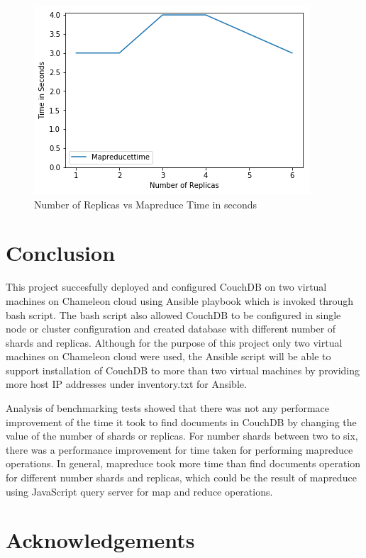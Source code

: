 \begin{figure}[!ht]
  \centering\includegraphics[width=\columnwidth]{../images/ReplicasMapReduce.png}
  \caption{Number of Replicas vs Mapreduce Time in seconds }\label{f:replica-mapreduce}
\end{figure}

\section{Conclusion}
This project succesfully deployed and configured CouchDB  on two virtual machines
on Chameleon cloud using Ansible playbook which is invoked through
bash script. The bash script also allowed CouchDB to be configured in
single node or cluster configuration and created database with
different number of shards and replicas. Although for the purpose of
this project only two virtual machines on Chameleon cloud were used,
the Ansible script will be able to support installation of CouchDB to more
than two virtual machines by providing more host IP addresses under
inventory.txt for Ansible.

Analysis of benchmarking tests showed that there was not any performace
improvement of the time it took to find documents in CouchDB  by
changing the value of the number of shards or replicas. For number
shards between two to six, there was a performance improvement for
time taken for performing mapreduce operations. In general, mapreduce
took more time than find documents operation for different number
shards and replicas, which could be the result of mapreduce using
JavaScript query server for map and reduce operations.


\section*{Acknowledgements}

